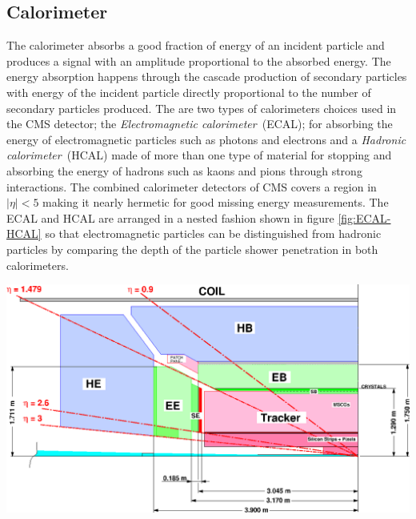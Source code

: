 \subsection{Calorimeter}
The calorimeter absorbs a good fraction of energy of an incident particle and produces a signal with an amplitude proportional to the absorbed energy. The energy absorption happens through the cascade production of secondary particles with energy of the incident particle directly proportional to the number of secondary particles produced. The are two types of calorimeters choices used in the CMS detector; the \textit{Electromagnetic calorimeter}~(ECAL); for absorbing the energy of electromagnetic particles such as photons and electrons and a \textit{Hadronic calorimeter}~(HCAL) made of more than one type of material for stopping and absorbing the energy of hadrons such as kaons and pions through strong interactions. The combined calorimeter detectors of CMS covers a region in $|\eta| < 5 $ making it nearly hermetic for good missing energy measurements. The ECAL and HCAL are arranged in a nested fashion shown in figure \ref{fig:ECAL-HCAL} so that electromagnetic particles can be distinguished from hadronic particles by comparing the depth of the particle shower penetration in both calorimeters.

\begin{center}
\centering
\mbox{\includegraphics[scale=0.5]{THESISPLOTS/ECAL-HCAL.eps}} 
\label{fig:ECAL-HCAL}
\end{center}


